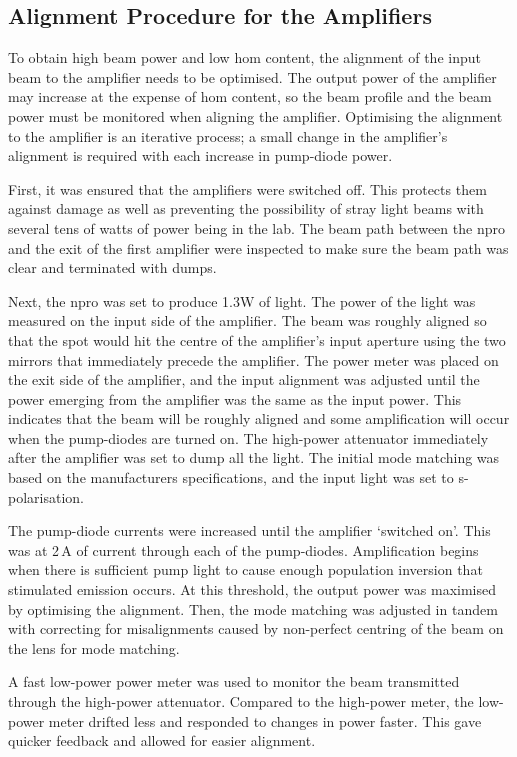 \subsection{Alignment Procedure for the Amplifiers}
To obtain high beam power and low \gls{hom} content, the alignment of the input beam to the amplifier needs to be optimised. The output power of the amplifier may increase at the expense of \gls{hom} content, so the beam profile and the beam power must be monitored when aligning the amplifier. Optimising the alignment to the amplifier is an iterative process; a small change in the amplifier's alignment is required with each increase in pump-diode power.
\par
First, it was ensured that the amplifiers were switched off. This protects them against damage as well as preventing the possibility of stray light beams with several tens of watts of power being in the lab. The beam path between the \gls{npro} and the exit of the first amplifier were inspected to make sure the beam path was clear and terminated with dumps.
\par
Next, the \gls{npro} was set to produce 1.3W of light. The power of the light was measured on the input side of the amplifier. The beam was roughly aligned so that the spot would hit the centre of the amplifier's input aperture using the two mirrors that immediately precede the amplifier. The power meter was placed on the exit side of the amplifier, and the input alignment was adjusted until the power emerging from the amplifier was the same as the input power. This indicates that the beam will be roughly aligned and some amplification will occur when the pump-diodes are turned on. The high-power attenuator immediately after the amplifier was set to dump all the light. The initial mode matching was based on the manufacturers specifications, and the input light was set to s-polarisation.
\par
The pump-diode currents were increased until the amplifier `switched on'. This was at 2\,A of current through each of the pump-diodes. Amplification begins when there is sufficient pump light to cause enough population inversion that stimulated emission occurs. At this threshold, the output power was maximised by optimising the alignment. Then, the mode matching was adjusted in tandem with correcting for misalignments caused by non-perfect centring of the beam on the lens for mode matching.
\par
A fast low-power power meter was used to monitor the beam transmitted through the high-power attenuator. Compared to the high-power meter, the low-power meter drifted less and responded to changes in power faster. This gave quicker feedback and allowed for easier alignment. 
